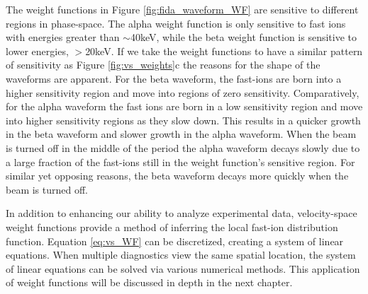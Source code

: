 The weight functions in Figure \ref{fig:fida_waveform_WF} are sensitive to different regions in phase-space. The alpha weight function is only sensitive to fast ions with energies greater than $\sim$40keV, while the beta weight function is sensitive to lower energies, $>$20keV. If we take the weight functions to have a similar pattern of sensitivity as Figure \ref{fig:vs_weights}c the reasons for the shape of the waveforms are apparent. For the beta waveform, the fast-ions are born into a higher sensitivity region and move into regions of zero sensitivity. Comparatively, for the alpha waveform the fast ions are born in a low sensitivity region and move into higher sensitivity regions as they slow down. This results in a quicker growth in the beta waveform and slower growth in the alpha waveform. When the beam is turned off in the middle of the period the alpha waveform decays slowly due to a large fraction of the fast-ions still in the weight function's sensitive region. For similar yet opposing reasons, the beta waveform decays more quickly when the beam is turned off.

In addition to enhancing our ability to analyze experimental data, velocity-space weight functions provide a method of inferring the local fast-ion distribution function\cite{salewski2013_tomography,salewski2014_tomography}. Equation \ref{eq:vs_WF} can be discretized, creating a system of linear equations. When multiple diagnostics view the same spatial location, the system of linear equations can be solved via various numerical methods\cite{jacobsen_stagner2016}. This application of weight functions will be discussed in depth in the next chapter.


